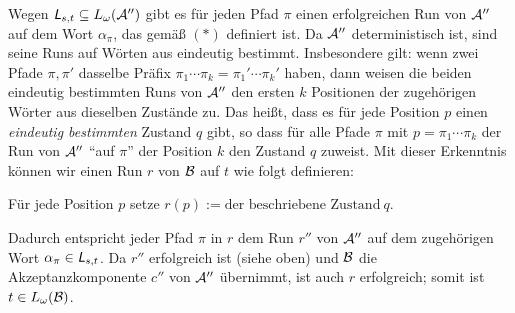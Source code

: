 \documentclass[fontsize=11pt, twoside=false, numbers=autoenddot]{scrbook}
\begin{document}
\begin{description}
    Wegen $\textsf{\textit{L}}_{s,t} \subseteq L_\omega(\mathcal{A}'')$ gibt es für jeden Pfad $\pi$
    einen erfolgreichen Run von $\mathcal{A}''$ auf dem Wort $\alpha_\pi$,
    das gemäß $(*)$ definiert ist.
    Da $\mathcal{A}''$ deterministisch ist, sind seine Runs auf Wörten aus \Lst
    eindeutig bestimmt.
    Insbesondere gilt: wenn zwei Pfade $\pi,\pi'$ dasselbe Präfix
    $\pi_1\cdots\pi_k=\pi_1'\cdots\pi_k'$ haben,
    dann weisen die beiden eindeutig bestimmten Runs von $\mathcal{A}''$
    den ersten $k$ Positionen der zugehörigen Wörter aus \Lst
    dieselben Zustände zu.
    Das heißt, dass es für jede Position $p$ einen \emph{eindeutig bestimmten}
    Zustand $q$ gibt, so dass für alle Pfade $\pi$ mit $p=\pi_1\cdots\pi_k$
    der Run von $\mathcal{A}''$ "`auf $\pi$"' der Position $k$ den Zustand $q$ zuweist.
    Mit dieser Erkenntnis können wir einen Run $r$ von $\mathcal{B}$ auf $t$ wie folgt definieren:
    \begin{center}
      \parbox{.8\linewidth}{%
        Für jede Position $p$ setze $r(p) := \text{der beschriebene Zustand}~ q$.
      }
    \end{center}
    Dadurch entspricht jeder Pfad $\pi$ in $r$ dem Run $r''$ von $\mathcal{A}''$
    auf dem zugehörigen Wort $\alpha_\pi \in \textsf{\textit{L}}_{s,t}$.
    Da $r''$ erfolgreich ist (siehe oben) und $\mathcal{B}$ die Akzeptanzkomponente $c''$
    von $\mathcal{A}''$ übernimmt, ist auch $r$ erfolgreich;
    somit ist $t \in L_\omega(\mathcal{B})$.
    \qedhere
\end{description}
\end{document}
